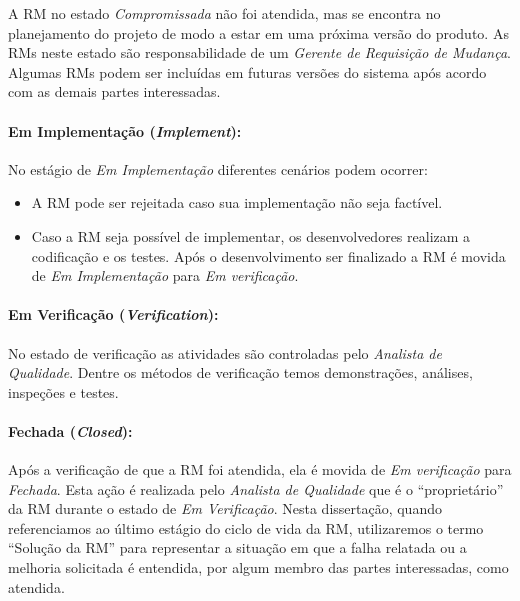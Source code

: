 A RM no estado \textit{Compromissada} não foi atendida, mas se encontra no
planejamento do projeto de modo a estar em uma próxima versão do produto. As RMs
neste estado são responsabilidade de um \textit{Gerente de Requisição de
    Mudança}. Algumas RMs podem ser incluídas em futuras versões do sistema após
acordo com as demais partes interessadas.

\paragraph{Em Implementação (\textit{Implement}):}\label{par:em_implementacao}

No estágio de \textit{Em Implementação} diferentes cenários podem ocorrer:

\begin{itemize}
	\item A RM pode ser rejeitada caso sua implementação não seja factível.
    \item Caso a RM seja possível de implementar, os desenvolvedores realizam a
        codificação e os testes. Após o desenvolvimento ser finalizado a RM é
        movida de \textit{Em Implementação} para \textit{Em verificação}.
\end{itemize}

\paragraph{Em Verificação (\textit{Verification}):}\label{par:em_verificacao}

No estado de verificação as atividades são controladas pelo \textit{Analista de
Qualidade}. Dentre os métodos de verificação temos demonstrações, análises,
inspeções e testes.

\paragraph{Fechada (\textit{Closed}):}\label{par:fechada}

Após a verificação de que a RM foi atendida, ela é movida de \textit{Em
    verificação} para \textit{Fechada}. Esta ação é realizada pelo
\textit{Analista de Qualidade} que é o ``proprietário'' da RM durante o estado
de \textit{Em Verificação}. Nesta dissertação, quando referenciamos ao último
estágio do ciclo de vida da RM, utilizaremos o termo ``Solução da RM'' para
representar a situação em que a falha relatada ou a melhoria solicitada é
entendida, por algum membro das partes interessadas, como atendida.


